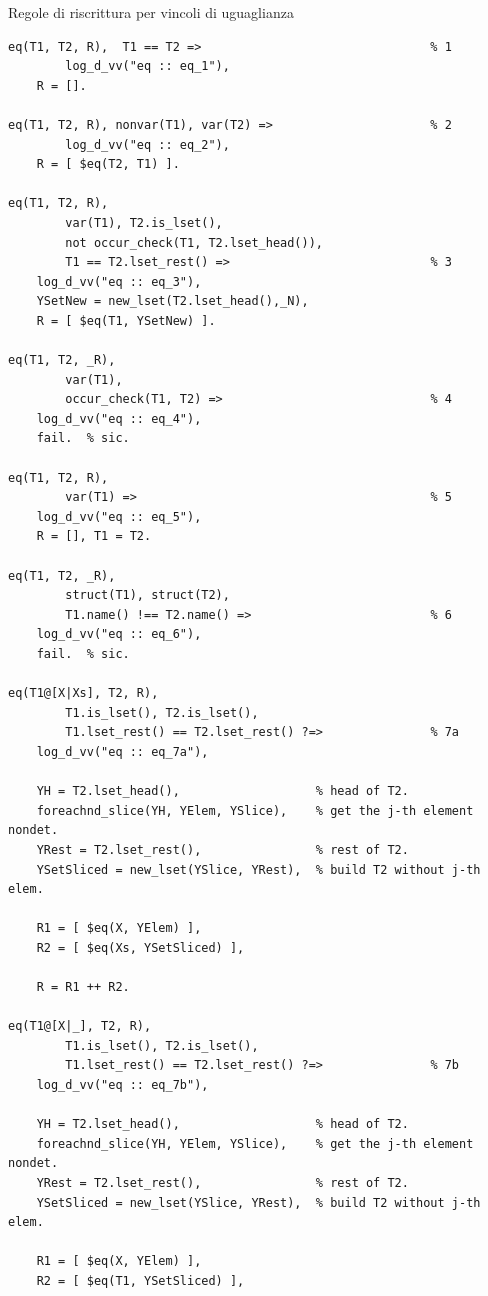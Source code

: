 \documentclass[12pt,a4paper,openright]{book}  %
\begin{document}
\begin{algorithm}[H]
	\caption{Regole di riscrittura per vincoli di uguaglianza}
	\label{alg:eq_constraints}
\end{algorithm}
\begin{verbatim}
eq(T1, T2, R),  T1 == T2 =>                                % 1
        log_d_vv("eq :: eq_1"),
    R = [].

eq(T1, T2, R), nonvar(T1), var(T2) =>                      % 2
        log_d_vv("eq :: eq_2"),
    R = [ $eq(T2, T1) ].

eq(T1, T2, R),
        var(T1), T2.is_lset(),
        not occur_check(T1, T2.lset_head()),
        T1 == T2.lset_rest() =>                            % 3
   	log_d_vv("eq :: eq_3"),
    YSetNew = new_lset(T2.lset_head(),_N),
    R = [ $eq(T1, YSetNew) ].

eq(T1, T2, _R),
        var(T1),
        occur_check(T1, T2) =>                             % 4
    log_d_vv("eq :: eq_4"),
    fail.  % sic.

eq(T1, T2, R),
        var(T1) =>                                         % 5
    log_d_vv("eq :: eq_5"),
    R = [], T1 = T2.

eq(T1, T2, _R),
        struct(T1), struct(T2),
        T1.name() !== T2.name() =>                         % 6
    log_d_vv("eq :: eq_6"),
    fail.  % sic.

eq(T1@[X|Xs], T2, R),
        T1.is_lset(), T2.is_lset(),
        T1.lset_rest() == T2.lset_rest() ?=>               % 7a
    log_d_vv("eq :: eq_7a"),

    YH = T2.lset_head(),                   % head of T2.
    foreachnd_slice(YH, YElem, YSlice),    % get the j-th element nondet.
    YRest = T2.lset_rest(),                % rest of T2.
    YSetSliced = new_lset(YSlice, YRest),  % build T2 without j-th elem.

    R1 = [ $eq(X, YElem) ],
    R2 = [ $eq(Xs, YSetSliced) ],

    R = R1 ++ R2.

eq(T1@[X|_], T2, R),
        T1.is_lset(), T2.is_lset(),
        T1.lset_rest() == T2.lset_rest() ?=>               % 7b
    log_d_vv("eq :: eq_7b"),

    YH = T2.lset_head(),                   % head of T2.
    foreachnd_slice(YH, YElem, YSlice),    % get the j-th element nondet.
    YRest = T2.lset_rest(),                % rest of T2.
    YSetSliced = new_lset(YSlice, YRest),  % build T2 without j-th elem.

    R1 = [ $eq(X, YElem) ],
    R2 = [ $eq(T1, YSetSliced) ],


\end{verbatim}
\end{document}
